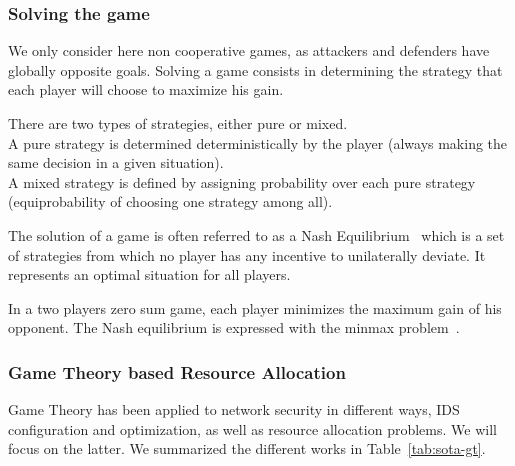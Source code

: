\subsubsection{Solving the game}
We only consider here non cooperative games, as attackers and defenders have globally opposite goals.
Solving a game consists in determining the strategy that each player will choose to maximize his gain.

There are two types of strategies, either pure or mixed.\\
A pure strategy is determined deterministically by the player (\ie always making the same decision in a given situation).\\
A mixed strategy is defined by assigning probability over each pure strategy (\eg equiprobability of choosing one strategy among all).

The solution of a game is often referred to as a Nash Equilibrium~\cite{nasheq} which is a set of strategies from which no player has any incentive to unilaterally deviate. It represents an optimal situation for all players.

In a two players zero sum game, each player minimizes the maximum gain of his opponent. 
The Nash equilibrium is expressed with the minmax problem~\cite{minmax}.

\subsubsection{Game Theory based Resource Allocation}
Game Theory has been applied to network security in different ways, IDS configuration and optimization, as well as resource allocation problems. We will focus on the latter. We summarized the different works in Table~\ref{tab:sota-gt}.

